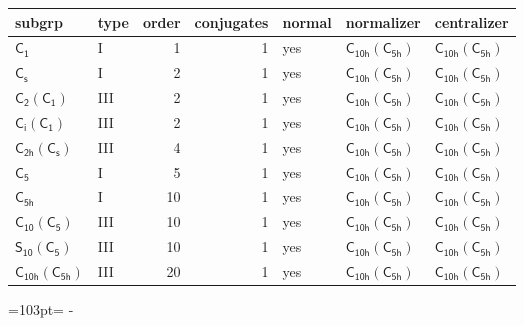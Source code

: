 \documentclass[10pt,a4paper]{article}
\newcommand{\needspace}[1]{\par\penalty-100\begingroup\dimen0=#1\relax\dimen2=\pagegoal
  \advance\dimen2-\pagetotal\ifdim\dimen0>\dimen2\relax\ifdim\dimen2>0pt\vfil\break\fi\fi
  \endgroup}
\numberwithin{equation}{section}
\newcommand{\grp}[1]{\mathsf{#1}}
\begin{document}
{\small\begin{longtable}{@{}llrrlll@{}}\toprule
subgrp & type & order & conjugates & normal & normalizer & centralizer\\\midrule\endhead
\bottomrule\endfoot\endlastfoot
\href{../../../rotation/data/pdf/C1.pdf}{$\grp{C_{1}}$} & I & 1 & 1 & yes & \href{C10h-C5h.pdf}{$\grp{C_{10h}}(\grp{C_{5h}})$} & \href{C10h-C5h.pdf}{$\grp{C_{10h}}(\grp{C_{5h}})$}\\*
\href{../../../rotation/data/pdf/C1v.pdf}{$\grp{C_{s}}$} & I & 2 & 1 & yes & \href{C10h-C5h.pdf}{$\grp{C_{10h}}(\grp{C_{5h}})$} & \href{C10h-C5h.pdf}{$\grp{C_{10h}}(\grp{C_{5h}})$}\\*
\href{C2-C1.pdf}{$\grp{C_{2}}(\grp{C_{1}})$} & III & 2 & 1 & yes & \href{C10h-C5h.pdf}{$\grp{C_{10h}}(\grp{C_{5h}})$} & \href{C10h-C5h.pdf}{$\grp{C_{10h}}(\grp{C_{5h}})$}\\*
\href{S2-C1.pdf}{$\grp{C_{i}}(\grp{C_{1}})$} & III & 2 & 1 & yes & \href{C10h-C5h.pdf}{$\grp{C_{10h}}(\grp{C_{5h}})$} & \href{C10h-C5h.pdf}{$\grp{C_{10h}}(\grp{C_{5h}})$}\\*
\href{C2h-C1v.pdf}{$\grp{C_{2h}}(\grp{C_{s}})$} & III & 4 & 1 & yes & \href{C10h-C5h.pdf}{$\grp{C_{10h}}(\grp{C_{5h}})$} & \href{C10h-C5h.pdf}{$\grp{C_{10h}}(\grp{C_{5h}})$}\\*
\href{../../../rotation/data/pdf/C5.pdf}{$\grp{C_{5}}$} & I & 5 & 1 & yes & \href{C10h-C5h.pdf}{$\grp{C_{10h}}(\grp{C_{5h}})$} & \href{C10h-C5h.pdf}{$\grp{C_{10h}}(\grp{C_{5h}})$}\\*
\href{../../../rotation/data/pdf/C5h.pdf}{$\grp{C_{5h}}$} & I & 10 & 1 & yes & \href{C10h-C5h.pdf}{$\grp{C_{10h}}(\grp{C_{5h}})$} & \href{C10h-C5h.pdf}{$\grp{C_{10h}}(\grp{C_{5h}})$}\\*
\href{C10-C5.pdf}{$\grp{C_{10}}(\grp{C_{5}})$} & III & 10 & 1 & yes & \href{C10h-C5h.pdf}{$\grp{C_{10h}}(\grp{C_{5h}})$} & \href{C10h-C5h.pdf}{$\grp{C_{10h}}(\grp{C_{5h}})$}\\*
\href{S10-C5.pdf}{$\grp{S_{10}}(\grp{C_{5}})$} & III & 10 & 1 & yes & \href{C10h-C5h.pdf}{$\grp{C_{10h}}(\grp{C_{5h}})$} & \href{C10h-C5h.pdf}{$\grp{C_{10h}}(\grp{C_{5h}})$}\\*
\href{C10h-C5h.pdf}{$\grp{C_{10h}}(\grp{C_{5h}})$} & III & 20 & 1 & yes & \href{C10h-C5h.pdf}{$\grp{C_{10h}}(\grp{C_{5h}})$} & \href{C10h-C5h.pdf}{$\grp{C_{10h}}(\grp{C_{5h}})$}\\
\bottomrule\end{longtable}}
\needspace{103pt}
\end{document}
